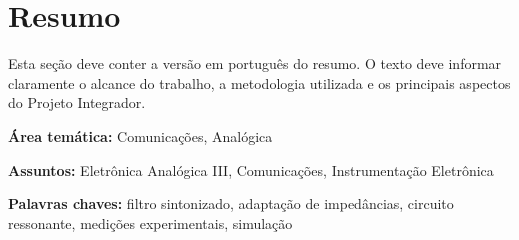 \chapter*{Resumo}

Esta seção deve conter a versão em português do resumo. O texto deve informar claramente o alcance do trabalho, a metodologia utilizada e os principais aspectos do Projeto Integrador.

\vspace{1cm}

\noindent\textbf{Área temática:} Comunicações, Analógica

\vspace{0.5cm}

\noindent\textbf{Assuntos:} Eletrônica Analógica III, Comunicações, Instrumentação Eletrônica

\vspace{0.5cm}

\noindent\textbf{Palavras chaves:} filtro sintonizado, adaptação de impedâncias, circuito ressonante, medições experimentais, simulação